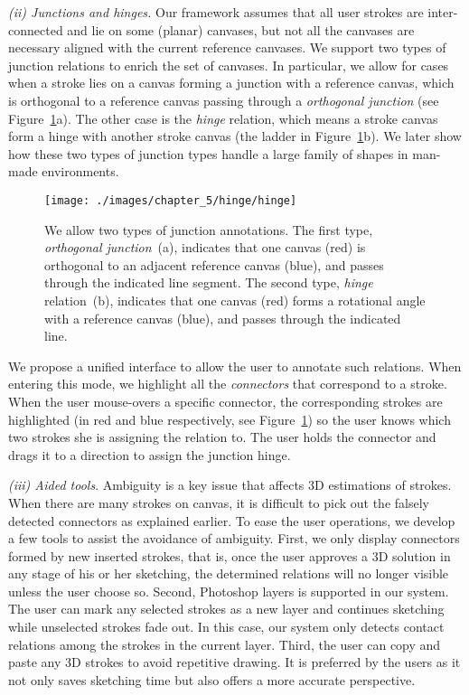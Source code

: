{\emph{(ii) Junctions and hinges.} Our framework assumes that all user strokes are inter-connected and lie on some (planar) canvases, but not all the canvases are necessary aligned with the current reference canvases. We support two types of junction relations to enrich the set of canvases. In particular, we allow for cases when a stroke lies on a canvas forming a junction with a reference canvas, which is orthogonal to a reference canvas passing through a {\em orthogonal junction} (see Figure~\ref{fig:junction_types}a). The other case is the {\em hinge} relation, which means a stroke canvas form a hinge with another stroke canvas (the ladder in Figure~\ref{fig:junction_types}b). We later show how  these two types of junction types handle a large family of shapes in man-made environments.


\begin{figure}[b!]
  \vnudge
  \texttt{[image: ./images/chapter\_5/hinge/hinge]}
  \caption{We allow two types of junction annotations. The first type, {\em orthogonal junction}~(a), indicates that one canvas (red) is orthogonal to an adjacent reference canvas (blue), and passes through the indicated line segment. The second type, {\em hinge} relation~(b), indicates that one canvas (red) forms a rotational angle with a reference canvas (blue), and passes through the indicated line.%
  }
  \label{fig:junction_types}
\end{figure}


We propose a unified interface to allow the user to annotate such relations. When entering this mode, we highlight all the \emph{connectors} that correspond to a stroke. When the user mouse-overs a specific connector, the corresponding strokes are highlighted (in red and blue respectively, see Figure~\ref{fig:junction_types}) so the user knows which two strokes she is assigning the relation to. The user holds the connector and drags it to a direction to assign the junction hinge.

\emph{(iii) Aided tools}. Ambiguity is a key issue that affects 3D estimations of strokes. When there are many strokes on canvas, it is difficult to pick out the falsely detected connectors as explained earlier. To ease the user operations, we develop a few tools to assist the avoidance of ambiguity. First, we only display connectors formed by new inserted strokes, that is, once the user approves a 3D solution in any stage of his or her sketching, the determined relations will no longer visible unless the user choose so. Second, Photoshop layers is supported in our system. The user can mark any selected strokes as a new layer and continues sketching while unselected strokes fade out. In this case, our system only detects contact relations among the strokes in the current layer. Third, the user can copy and paste any 3D strokes to avoid repetitive drawing. It is preferred by the users as it not only saves sketching time but also offers a more accurate perspective.


}
